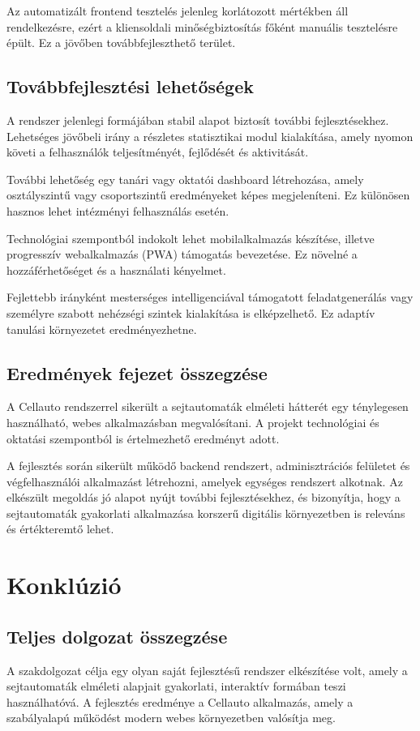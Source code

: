 \documentclass{thesis-ekf}
\begin{document}
Az automatizált frontend tesztelés jelenleg korlátozott mértékben áll rendelkezésre, ezért a kliensoldali minőségbiztosítás főként manuális tesztelésre épült. Ez a jövőben továbbfejleszthető terület.

\section{Továbbfejlesztési lehetőségek}
A rendszer jelenlegi formájában stabil alapot biztosít további fejlesztésekhez. Lehetséges jövőbeli irány a részletes statisztikai modul kialakítása, amely nyomon követi a felhasználók teljesítményét, fejlődését és aktivitását.

További lehetőség egy tanári vagy oktatói dashboard létrehozása, amely osztályszintű vagy csoportszintű eredményeket képes megjeleníteni. Ez különösen hasznos lehet intézményi felhasználás esetén.

Technológiai szempontból indokolt lehet mobilalkalmazás készítése, illetve progresszív webalkalmazás (PWA) támogatás bevezetése. Ez növelné a hozzáférhetőséget és a használati kényelmet.

Fejlettebb irányként mesterséges intelligenciával támogatott feladatgenerálás vagy személyre szabott nehézségi szintek kialakítása is elképzelhető. Ez adaptív tanulási környezetet eredményezhetne.

\section{Eredmények fejezet összegzése}
A Cellauto rendszerrel sikerült a sejtautomaták elméleti hátterét egy ténylegesen használható, webes alkalmazásban megvalósítani. A projekt technológiai és oktatási szempontból is értelmezhető eredményt adott.

A fejlesztés során sikerült működő backend rendszert, adminisztrációs felületet és végfelhasználói alkalmazást létrehozni, amelyek egységes rendszert alkotnak. Az elkészült megoldás jó alapot nyújt további fejlesztésekhez, és bizonyítja, hogy a sejtautomaták gyakorlati alkalmazása korszerű digitális környezetben is releváns és értékteremtő lehet.

\chapter{Konklúzió}

\section{Teljes dolgozat összegzése}
A szakdolgozat célja egy olyan saját fejlesztésű rendszer elkészítése volt, amely a sejtautomaták elméleti alapjait gyakorlati, interaktív formában teszi használhatóvá. A fejlesztés eredménye a Cellauto alkalmazás, amely a szabályalapú működést modern webes környezetben valósítja meg.
\end{document}

